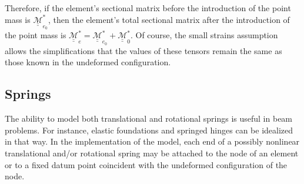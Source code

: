 \documentclass[12pt,a4paper,oneside,english]{abntex2} %
\newcommand{\fix}[1]{{\color{red}#1}}
\def\tens#1{\underline{\underline{#1}}}
\def\Mass{\mathcal{\tens{M}}^*}
\def\Masse{\Mass_e}
\begin{document}
\begin{apendicesenv}
Therefore, if the element's sectional matrix before the introduction of the point mass is $\Mass_{e_0}$, then the element's total sectional matrix after the introduction of the point mass is $\Masse = \Mass_{e_0} + \Mass_{0}$. Of course, the small strains assumption allows the simplifications that the values of these tensors remain the same as those known in the undeformed configuration.

\subsection{Springs}
\label{sec:springs}

The ability to model both translational and rotational springs is useful in beam problems. For instance, elastic foundations and springed hinges can be idealized in that way. In the implementation of the model, each end of a possibly nonlinear translational and/or rotational spring may be attached to the node of an element or to a fixed datum \fix{point coincident with the undeformed configuration of the node.}


\end{apendicesenv}
\end{document}
